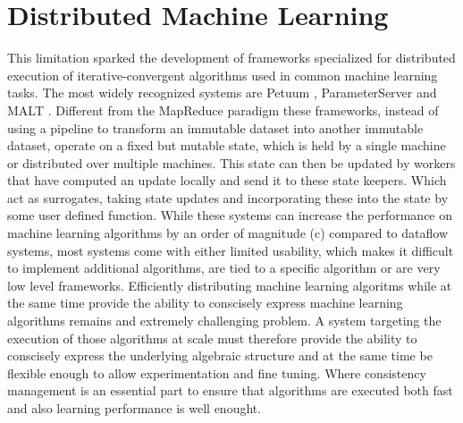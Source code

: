 \section{Distributed Machine Learning}
This limitation sparked the development of frameworks specialized for distributed execution of iterative-convergent algorithms used in common machine learning tasks.
The most widely recognized systems are Petuum \cite{Xing2015}, ParameterServer \cite{Li2014} and MALT \cite{Li2015}.
Different from the MapReduce paradigm these frameworks, instead of using a pipeline to transform an immutable dataset into another immutable dataset, operate on a fixed but mutable state, which is held by a single machine or distributed over multiple machines.
This state can then be updated by workers that have computed an update locally and send it to these state keepers. Which act as surrogates, taking state updates and incorporating these into the state by some user defined function.
While these systems can increase the performance on machine learning algorithms by an order of magnitude (c) compared to dataflow systems, most systems come with either limited usability, which makes it difficult to implement additional algorithms, are tied to a specific algorithm or are very low level frameworks.
Efficiently distributing machine learning algoritms while at the same time provide the ability to conscisely express machine learning algorithms remains and extremely challenging problem.
A system targeting the execution of those algorithms at scale must therefore provide the ability to conscisely express the underlying algebraic structure and at the same time be flexible enough to allow experimentation and fine tuning.
Where consistency management is an essential part to ensure that algorithms are executed both fast and also learning performance is well enought.


